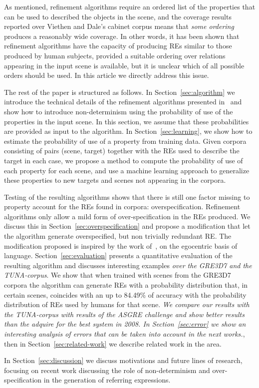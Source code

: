 As mentioned, refinement algorithms require an 
ordered list of the properties that can be used to described the objects in the scene, and the coverage results reported over Viethen and 
Dale's cabinet corpus means that \emph{some ordering} produces a reasonably wide coverage.  In other words, it has been shown that refinement algorithms have the capacity of producing REs similar to those produced by human subjects, provided a suitable ordering over relations appearing 
in the input scene is available, but it is unclear which of all possible orders should be used.  In this article we directly address this issue.  


The rest of the paper is structured as follows. In Section~\ref{sec:algorithm} we introduce the technical details of the 
refinement algorithms presented in~\cite{arec2:2008:Areces,arec:usin11} and show how to introduce non-determinism using 
the probability of use of the properties in the input scene. In this section, we assume that these probabilities are provided as 
input to the algorithm. In Section~\ref{sec:learning}, we show how to estimate the 
probability of use of a property from training data. Given corpora consisting of pairs (scene, target) together with the REs used to 
describe the target in each case, we propose a method to compute the probability of use of each property for each scene, and use a machine learning approach to generalize these properties to new targets and scenes not appearing in the corpora. 

Testing of the resulting algorithms shows that there is still one factor missing to property account for the REs found in corpora: overspecification.  Refinement algorithms only allow a mild form of over-specification in the REs produced.  We discuss this in 
Section~\ref{sec:overspecification} and propose a modification that let the algorithm generate overspecified, but non trivially redundant RE.  The modification proposed is inspired by the work of~, on the egocentric basis of language.  
Section~\ref{sec:evaluation} presents a quantitative evaluation of the resulting algorithm and discusses interesting examples \textit{over the GRE3D7 and the TUNA-corpus}. 
We show that when trained with scenes from the GRE3D7 corpora the algorithm can generate REs with a probability distribution that, 
in certain scenes, coincides with an up to 84.49\% of accuracy with the probability distribution of REs used by humans for that scene. 
\textit{We compare our results with the TUNA-corpus with results of the ASGRE challenge and show better results than the adquire for the best system in 2008.
In Section~\ref{sec:error} we show an interesting analysis of errors that can be taken into account in the next works.}, then in Section~\ref{sec:related-work} we describe related work in the area.

In Section~\ref{sec:discussion} we discuss motivations and future lines of research, focusing on recent work discussing the role 
of non-determinism and over-specification in the generation of referring expressions. 

